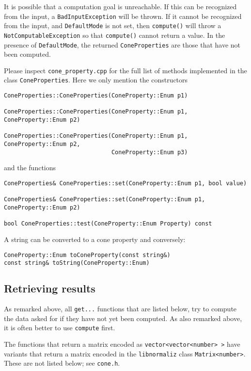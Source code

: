 \documentclass[12pt,a4paper]{scrartcl}
\theoremstyle{definition}
\begin{document}
\begin{small}
It is possible that a computation goal is unreachable. If this can be recognized from the input, a \verb|BadInputException| will be thrown. If it cannot be recognized from the input, and \verb|DefaultMode| is not set, then \verb|compute()| will throw a \verb|NotComputableException| so that \verb|compute()| cannot return a value. In the presence of \verb|DefaultMode|, the returned \verb|ConeProperties| are those that have not been computed.

Please inspect \verb|cone_property.cpp| for the full list of methods implemented in the class \verb|ConeProperties|. Here we only mention the constructors
\begin{Verbatim}
ConeProperties::ConeProperties(ConeProperty::Enum p1)

ConeProperties::ConeProperties(ConeProperty::Enum p1, ConeProperty::Enum p2)

ConeProperties::ConeProperties(ConeProperty::Enum p1, ConeProperty::Enum p2,
                               ConeProperty::Enum p3)
\end{Verbatim}
and the functions
\begin{Verbatim}
ConeProperties& ConeProperties::set(ConeProperty::Enum p1, bool value)

ConeProperties& ConeProperties::set(ConeProperty::Enum p1, ConeProperty::Enum p2)

bool ConeProperties::test(ConeProperty::Enum Property) const
\end{Verbatim}

A string can be converted to a cone property and conversely:
\begin{Verbatim}
ConeProperty::Enum toConeProperty(const string&)
const string& toString(ConeProperty::Enum)
\end{Verbatim}


\subsection{Retrieving results}

As remarked above, all \verb|get...| functions that are listed below, try to compute the data asked for if they have not yet been computed. As also remarked above, it is often better to use \verb|compute| first.

The functions that return a matrix encoded as \verb|vector<vector<number> >| have variants that return a matrix encoded in the \verb|libnormaliz| class \verb|Matrix<number>|. These are not listed below; see \verb|cone.h|.


\end{small}
\end{document}
